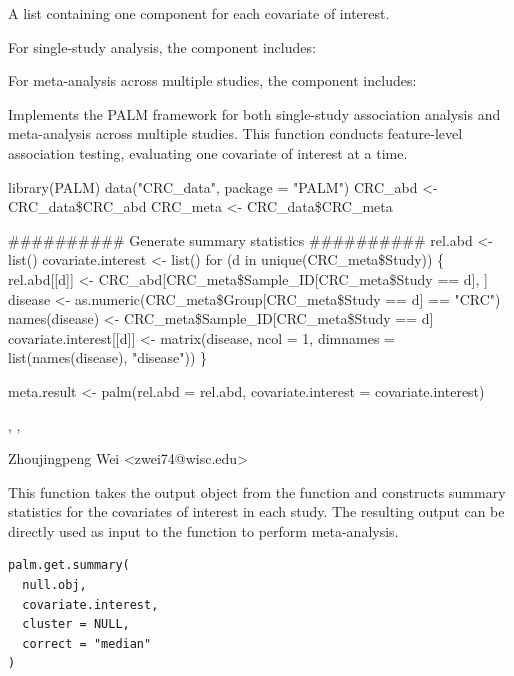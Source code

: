 \documentclass[a4paper]{book}
\begin{document}
\begin{Arguments}
\begin{ldescription}
\end{ldescription}

A list containing one component for each covariate of interest.

For single-study analysis, the component includes:


For meta-analysis across multiple studies, the component includes:



Implements the PALM framework for both single-study association analysis and
meta-analysis across multiple studies. This function conducts feature-level
association testing, evaluating one covariate of interest at a time.



library(PALM)
data("CRC\_data", package = "PALM")
CRC\_abd <- CRC\_data\$CRC\_abd
CRC\_meta <- CRC\_data\$CRC\_meta

\#\#\#\#\#\#\#\#\#\# Generate summary statistics \#\#\#\#\#\#\#\#\#\#
rel.abd <- list()
covariate.interest <- list()
for (d in unique(CRC\_meta\$Study)) \{
  rel.abd[[d]] <- CRC\_abd[CRC\_meta\$Sample\_ID[CRC\_meta\$Study == d], ]
  disease <- as.numeric(CRC\_meta\$Group[CRC\_meta\$Study == d] == "CRC")
  names(disease) <- CRC\_meta\$Sample\_ID[CRC\_meta\$Study == d]
  covariate.interest[[d]] <- matrix(disease, ncol = 1,
                                    dimnames = list(names(disease), "disease"))
\}

meta.result <- palm(rel.abd = rel.abd, covariate.interest = covariate.interest)



,
,


Zhoujingpeng Wei <zwei74@wisc.edu>

\end{Arguments}
%
\begin{Description}
This function takes the output object from the  function and
constructs summary statistics for the covariates of interest in each study.
The resulting output can be directly used as input to the  function
to perform meta-analysis.
\end{Description}
%
\begin{Usage}
\begin{verbatim}
palm.get.summary(
  null.obj,
  covariate.interest,
  cluster = NULL,
  correct = "median"
)
\end{verbatim}
\end{Usage}
\end{document}

